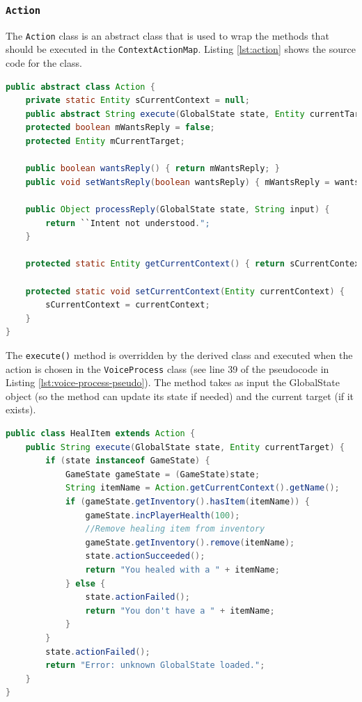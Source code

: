 \documentclass[11pt]{article}
\begin{document}
\subsubsection{\texttt{Action}}
\label{section:action}

The \texttt{Action} class is an abstract class that is used to wrap the methods that should be executed in the \texttt{ContextActionMap}. Listing \ref{lst:action} shows the source code for the class.

\begin{lstlisting}[language=Java, caption=Action.java, label={lst:action}]
public abstract class Action {
    private static Entity sCurrentContext = null;
    public abstract String execute(GlobalState state, Entity currentTarget);
    protected boolean mWantsReply = false;
    protected Entity mCurrentTarget;
    
    public boolean wantsReply() { return mWantsReply; }
    public void setWantsReply(boolean wantsReply) { mWantsReply = wantsReply; }

    public Object processReply(GlobalState state, String input) { 
        return ``Intent not understood.";
    }

    protected static Entity getCurrentContext() { return sCurrentContext; }

    protected static void setCurrentContext(Entity currentContext) {
        sCurrentContext = currentContext;
    }
}
\end{lstlisting}

The \texttt{execute()} method is overridden by the derived class and executed when the action is chosen in the \texttt{VoiceProcess} class (see line 39 of the pseudocode in Listing \ref{lst:voice-process-pseudo}). The method takes as input the GlobalState object (so the method can update its state if needed) and the current target (if it exists).

\begin{lstlisting}[language=Java, caption=HealItem.java, label={lst:heal-item}]
public class HealItem extends Action {
    public String execute(GlobalState state, Entity currentTarget) {
        if (state instanceof GameState) {
            GameState gameState = (GameState)state;
            String itemName = Action.getCurrentContext().getName();
            if (gameState.getInventory().hasItem(itemName)) {
                gameState.incPlayerHealth(100);
                //Remove healing item from inventory
                gameState.getInventory().remove(itemName);
                state.actionSucceeded();
                return "You healed with a " + itemName;
            } else {
                state.actionFailed();
                return "You don't have a " + itemName;
            }
        }
        state.actionFailed();
        return "Error: unknown GlobalState loaded.";
    }
}
\end{lstlisting}
\end{document}

